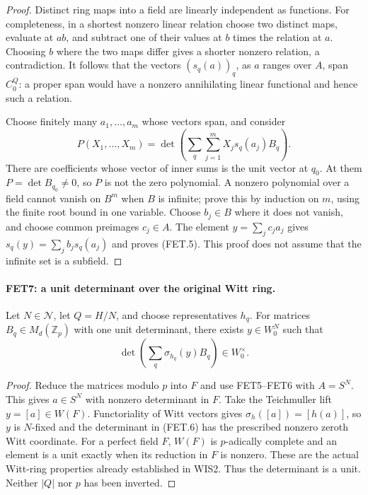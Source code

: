 \documentclass[11pt,a4paper]{article}
\numberwithin{equation}{section}
\theoremstyle{remark}\newtheorem{remark}[theorem]{Remark}
\begin{document}
\begin{proof}
Distinct ring maps into a field are linearly independent as
functions. For completeness, in a shortest nonzero linear relation
choose two distinct maps, evaluate at $ab$, and subtract one of
their values at $b$ times the relation at $a$. Choosing $b$ where
the two maps differ gives a shorter nonzero relation, a contradiction.
It follows that the vectors $(s_q(a))_q$, as $a$ ranges over $A$,
span $C_0^Q$: a proper span would have a nonzero annihilating
linear functional and hence such a relation.

Choose finitely many $a_1,\ldots,a_m$ whose vectors span, and
consider
\[
 P(X_1,\ldots,X_m)=
 \det\left(\sum_q\sum_{j=1}^m X_j s_q(a_j)B_q\right).
\]
There are coefficients whose vector of inner sums is the unit
vector at $q_0$. At them $P=\det B_{q_0}\ne0$, so $P$ is not
the zero polynomial. A nonzero polynomial over a field cannot
vanish on $B^m$ when $B$ is infinite; prove this by induction
on $m$, using the finite root bound in one variable.
Choose $b_j\in B$ where it does not vanish, and choose common
preimages $c_j\in A$. The element $y=\sum_j c_j a_j$ gives
$s_q(y)=\sum_j b_j s_q(a_j)$ and proves (FET.5).
This proof does not assume that the infinite set is a subfield.
\end{proof}

\paragraph{FET7: a unit determinant over the original Witt ring.}
\label{claim:FET7}
Let $N\in\mathcal N$, let $Q=H/N$, and choose representatives
$h_q$. For matrices $B_q\in M_d(\mathbb Z_p)$ with one unit
determinant, there exists $y\in W_0^N$ such that
\[
                  \det\left(\sum_q\sigma_{h_q}(y)B_q\right)
                        \in W_0^\times.                  \tag{FET.6}
\]

\begin{proof}
Reduce the matrices modulo $p$ into $F$ and use FET5--FET6
with $A=S^N$. This gives $a\in S^N$ with nonzero determinant
in $F$. Take the Teichmuller lift $y=[a]\in W(F)$.
Functoriality of Witt vectors gives
$\sigma_h([a])=[h(a)]$, so $y$ is $N$-fixed and the determinant
in (FET.6) has the prescribed nonzero zeroth Witt coordinate.
For a perfect field $F$, $W(F)$ is $p$-adically complete and an
element is a unit exactly when its reduction in $F$ is nonzero.
These are the actual Witt-ring properties already established in
WIS2. Thus the determinant is a unit. Neither $|Q|$ nor $p$
has been inverted.
\end{proof}
\end{document}
